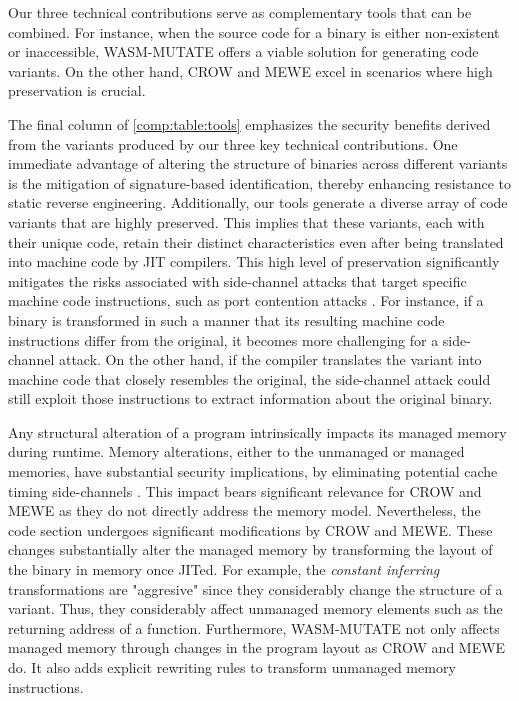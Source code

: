\begin{tcolorbox}[title=Takeaway,boxrule=1pt,arc=.2em,boxsep=1.0mm]
    
    Our three technical contributions serve as complementary tools that can be combined.
    For instance, when the source code for a \Wasm binary is either non-existent or inaccessible, WASM-MUTATE offers a viable solution for generating code variants. 
    On the other hand, CROW and MEWE excel in scenarios where high preservation is crucial.
\end{tcolorbox}


\label{security_applications}

The final column of \autoref{comp:table:tools} emphasizes the security benefits derived from the variants produced by our three key technical contributions. 
One immediate advantage of altering the structure of \Wasm binaries across different variants is the mitigation of signature-based identification, thereby enhancing resistance to static reverse engineering.
Additionally, our tools generate a diverse array of code variants that are highly preserved. 
This implies that these variants, each with their unique \Wasm code, retain their distinct characteristics even after being translated into machine code by JIT compilers. 
This high level of preservation significantly mitigates the risks associated with side-channel attacks that target specific machine code instructions, such as port contention attacks \cite{10.1145/3488932.3517411}.
For instance, if a \Wasm binary is transformed in such a manner that its resulting machine code instructions differ from the original, it becomes more challenging for a side-channel attack. 
On the other hand, if the compiler translates the variant into machine code that closely resembles the original, the side-channel attack could still exploit those instructions to extract information about the original \Wasm binary.

Any structural alteration of a \Wasm program intrinsically impacts its managed memory during runtime. 
Memory alterations, either to the unmanaged or managed memories, have substantial security implications, by eliminating potential cache timing side-channels \cite{Swivel}.
This impact bears significant relevance for CROW and MEWE as they do not directly address the \Wasm memory model.
Nevertheless, the \Wasm code section undergoes significant modifications by CROW and MEWE. 
These changes substantially alter the managed memory by transforming the layout of the \Wasm binary in memory once JITed.
For example, the \emph{constant inferring} transformations are "aggresive" since they considerably change the structure of a \Wasm variant.
Thus, they considerably affect unmanaged memory elements such as the returning address of a function.
Furthermore, WASM-MUTATE not only affects managed memory through changes in the \Wasm program layout as CROW and MEWE do.
It also adds explicit rewriting rules to transform unmanaged memory instructions.



